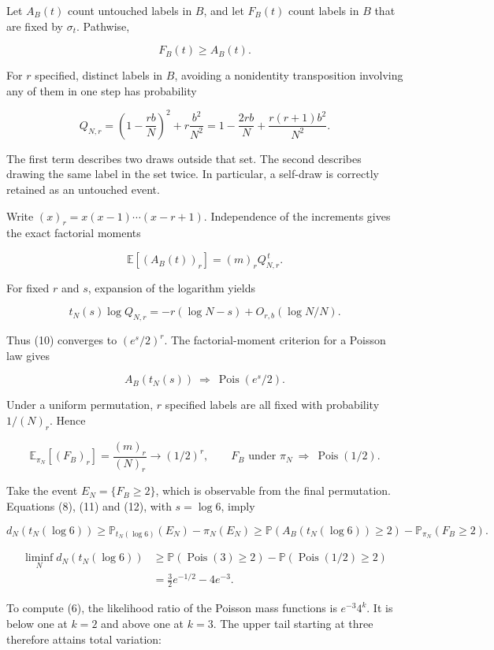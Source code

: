 \documentclass[
  british,
  11pt,
]{article}
\begin{document}
Let \(A_B(t)\) count untouched labels in \(B\), and let \(F_B(t)\) count
labels in \(B\) that are fixed by \(\sigma_t\). Pathwise,

\[F_B(t)\ge A_B(t). \tag{8}\]

For \(r\) specified, distinct labels in \(B\), avoiding a nonidentity
transposition involving any of them in one step has probability

\[
Q_{N,r}=\left(1-\frac{rb}{N}\right)^2
+r\frac{b^2}{N^2}
=1-\frac{2rb}{N}+\frac{r(r+1)b^2}{N^2}. \tag{9}
\]

The first term describes two draws outside that set. The second
describes drawing the same label in the set twice. In particular, a
self-draw is correctly retained as an untouched event.

Write \((x)_r=x(x-1)\cdots(x-r+1)\). Independence of the increments
gives the exact factorial moments

\[
\mathbb E[(A_B(t))_r]=(m)_r Q_{N,r}^{\,t}. \tag{10}
\]

For fixed \(r\) and \(s\), expansion of the logarithm yields

\[
t_N(s)\log Q_{N,r}
=-r(\log N-s)+O_{r,b}(\log N/N).
\]

Thus (10) converges to \((e^s/2)^r\). The factorial-moment criterion for
a Poisson law gives

\[A_B(t_N(s))\ \Longrightarrow\ \operatorname{Pois}(e^s/2). \tag{11}\]

Under a uniform permutation, \(r\) specified labels are all fixed with
probability \(1/(N)_r\). Hence

\[
\mathbb E_{\pi_N}[(F_B)_r]=\frac{(m)_r}{(N)_r}\longrightarrow(1/2)^r,
\qquad
F_B\text{ under }\pi_N\ \Longrightarrow\ \operatorname{Pois}(1/2). \tag{12}
\]

Take the event \(E_N=\{F_B\ge2\}\), which is observable from the final
permutation. Equations (8), (11) and (12), with \(s=\log6\), imply

\[
d_N(t_N(\log6))
\ge \mathbb P_{t_N(\log6)}(E_N)-\pi_N(E_N)
\ge \mathbb P(A_B(t_N(\log6))\ge2)-\mathbb P_{\pi_N}(F_B\ge2).
\]

\[
\begin{aligned}
\liminf_N d_N(t_N(\log6))
&\ge \mathbb P(\operatorname{Pois}(3)\ge2)
 -\mathbb P(\operatorname{Pois}(1/2)\ge2)\\
&=\frac32e^{-1/2}-4e^{-3}.
\end{aligned}
\]

To compute (6), the likelihood ratio of the Poisson mass functions is
\(e^{-3}4^k\). It is below one at \(k=2\) and above one at \(k=3\). The
upper tail starting at three therefore attains total variation:
\end{document}

